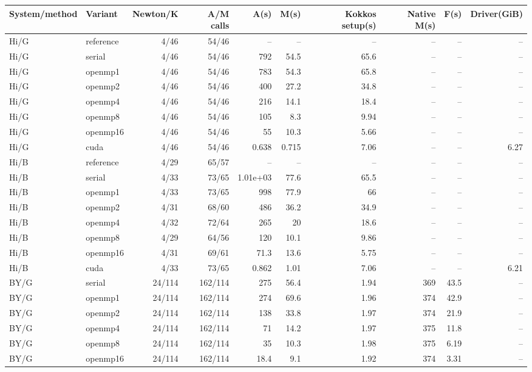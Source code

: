 \documentclass[11pt]{article}
\begin{document}
\scriptsize\begin{longtable}{llrrrrrrrr}
\toprule System/method & Variant & Newton/K & A/M calls & A(s) & M(s) & Kokkos setup(s) & Native M(s) & F(s) & Driver(GiB)\\
\midrule\endhead
Hi/G & reference & 4/46 & 54/46 & -- & -- & -- & -- & -- & --\\
Hi/G & serial & 4/46 & 54/46 & 792 & 54.5 & 65.6 & -- & -- & --\\
Hi/G & openmp1 & 4/46 & 54/46 & 783 & 54.3 & 65.8 & -- & -- & --\\
Hi/G & openmp2 & 4/46 & 54/46 & 400 & 27.2 & 34.8 & -- & -- & --\\
Hi/G & openmp4 & 4/46 & 54/46 & 216 & 14.1 & 18.4 & -- & -- & --\\
Hi/G & openmp8 & 4/46 & 54/46 & 105 & 8.3 & 9.94 & -- & -- & --\\
Hi/G & openmp16 & 4/46 & 54/46 & 55 & 10.3 & 5.66 & -- & -- & --\\
Hi/G & cuda & 4/46 & 54/46 & 0.638 & 0.715 & 7.06 & -- & -- & 6.27\\
Hi/B & reference & 4/29 & 65/57 & -- & -- & -- & -- & -- & --\\
Hi/B & serial & 4/33 & 73/65 & 1.01e+03 & 77.6 & 65.5 & -- & -- & --\\
Hi/B & openmp1 & 4/33 & 73/65 & 998 & 77.9 & 66 & -- & -- & --\\
Hi/B & openmp2 & 4/31 & 68/60 & 486 & 36.2 & 34.9 & -- & -- & --\\
Hi/B & openmp4 & 4/32 & 72/64 & 265 & 20 & 18.6 & -- & -- & --\\
Hi/B & openmp8 & 4/29 & 64/56 & 120 & 10.1 & 9.86 & -- & -- & --\\
Hi/B & openmp16 & 4/31 & 69/61 & 71.3 & 13.6 & 5.75 & -- & -- & --\\
Hi/B & cuda & 4/33 & 73/65 & 0.862 & 1.01 & 7.06 & -- & -- & 6.21\\
BY/G & serial & 24/114 & 162/114 & 275 & 56.4 & 1.94 & 369 & 43.5 & --\\
BY/G & openmp1 & 24/114 & 162/114 & 274 & 69.6 & 1.96 & 374 & 42.9 & --\\
BY/G & openmp2 & 24/114 & 162/114 & 138 & 33.8 & 1.97 & 374 & 21.9 & --\\
BY/G & openmp4 & 24/114 & 162/114 & 71 & 14.2 & 1.97 & 375 & 11.8 & --\\
BY/G & openmp8 & 24/114 & 162/114 & 35 & 10.3 & 1.98 & 375 & 6.19 & --\\
BY/G & openmp16 & 24/114 & 162/114 & 18.4 & 9.1 & 1.92 & 374 & 3.31 & --\\

\end{longtable}
\end{document}
